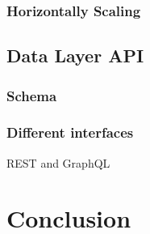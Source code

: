 \subsubsection{Horizontally Scaling}
\newpage
\subsection{Data Layer API}
\subsubsection{Schema}
\subsubsection{Different interfaces}
REST and GraphQL
\newpage
\setcounter{secnumdepth}{0} %
\section{Conclusion}
\lipsum[2]
